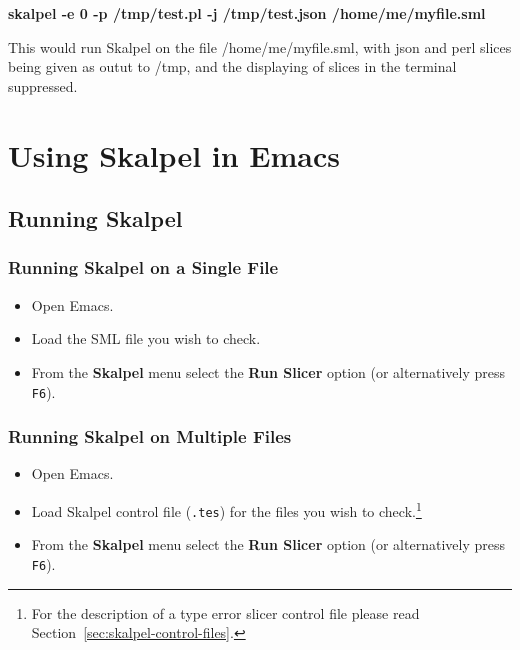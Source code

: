 \documentclass{report}
\newcommand{\note}[2][] {\todo[color=RoyalBlue, #1]{Note: #2}}
\begin{document}
\textbf{skalpel -e 0 -p /tmp/test.pl -j /tmp/test.json /home/me/myfile.sml}

This would run Skalpel on the file /home/me/myfile.sml, with json and
perl slices being given as outut to /tmp, and the displaying of slices
in the terminal suppressed.

\chapter{Using Skalpel in Emacs}

\section{Running Skalpel}


\subsection{Running Skalpel on a Single File}

\begin{itemize}
\item Open Emacs.
\item Load the SML file you wish to check.
\item From the \textbf{Skalpel} menu select the \textbf{Run Slicer}
  option (or alternatively press \texttt{F6}).
\end{itemize}

\subsection{Running Skalpel on Multiple Files}

\begin{itemize}
\item Open Emacs.
\item Load Skalpel control file (\texttt{.tes}) for
  the files you wish to check.\footnote{For the description of a type error slicer control file please read Section~\ref{sec:skalpel-control-files}.}
\item From the \textbf{Skalpel} menu select the \textbf{Run Slicer}
  option (or alternatively press \texttt{F6}).
\end{itemize}

\end{document}
